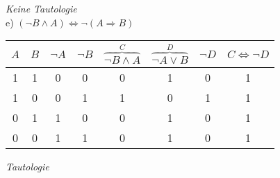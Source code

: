 \textit{Keine Tautologie}\\

e) $(\lnot B \land A) \Leftrightarrow \lnot (A \Rightarrow B)$\\

\begin{table}[h]
\centering
\begin{tabular}{c|c|c|c|c|c|c|c}
$A$ & $B$ & $\lnot A$ & $\lnot B$ & $\overbrace{\lnot B \land A}^{C}$ & $\overbrace{\lnot A \lor B}^{D}$ & $\lnot D$ & $C \Leftrightarrow \lnot D$\\
\hline
1 & 1 & 0 & 0 & 0 & 1 & 0 & 1\\
1 & 0 & 0 & 1 & 1 & 0 & 1 & 1\\
0 & 1 & 1 & 0 & 0 & 1 & 0 & 1\\
0 & 0 & 1 & 1 & 0 & 1 & 0 & 1\\
\end{tabular}
\end{table}

\textit{Tautologie}